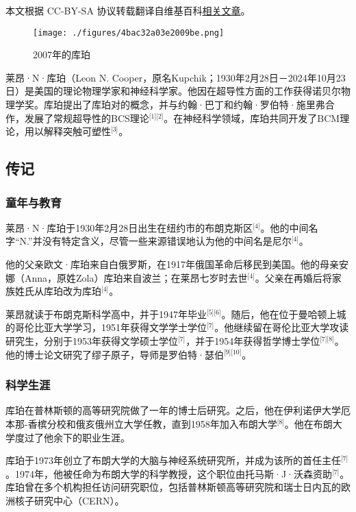
本文根据 CC-BY-SA 协议转载翻译自维基百科\href{https://en.wikipedia.org/wiki/Leon_Cooper}{相关文章}。

\begin{figure}[ht]
\centering
\texttt{[image: ./figures/4bac32a03e2009be.png]}
\caption{2007年的库珀} \label{fig_LAkb_3}
\end{figure}
莱昂·N·库珀（Leon N. Cooper，原名Kupchik；1930年2月28日－2024年10月23日）是美国的理论物理学家和神经科学家。他因在超导性方面的工作获得诺贝尔物理学奖。库珀提出了库珀对的概念，并与约翰·巴丁和约翰·罗伯特·施里弗合作，发展了常规超导性的BCS理论\(^\text{[1][2]}\)。在神经科学领域，库珀共同开发了BCM理论，用以解释突触可塑性\(^\text{[3]}\)。
\subsection{传记}
\subsubsection{童年与教育}
莱昂·N·库珀于1930年2月28日出生在纽约市的布朗克斯区\(^\text{[4]}\)。他的中间名字“N.”并没有特定含义，尽管一些来源错误地认为他的中间名是尼尔\(^\text{[4]}\)。

他的父亲欧文·库珀来自白俄罗斯，在1917年俄国革命后移民到美国。他的母亲安娜（Anna，原姓Zola）库珀来自波兰；在莱昂七岁时去世\(^\text{[4]}\)。父亲在再婚后将家族姓氏从库珀改为库珀\(^\text{[4]}\)。

莱昂就读于布朗克斯科学高中，并于1947年毕业\(^\text{[5][6]}\)。随后，他在位于曼哈顿上城的哥伦比亚大学学习，1951年获得文学学士学位\(^\text{[7]}\)。他继续留在哥伦比亚大学攻读研究生，分别于1953年获得文学硕士学位\(^\text{[7]}\)，并于1954年获得哲学博士学位\(^\text{[7][8]}\)。他的博士论文研究了缪子原子，导师是罗伯特·瑟伯\(^\text{[9][10]}\)。
\subsubsection{科学生涯}
库珀在普林斯顿的高等研究院做了一年的博士后研究。之后，他在伊利诺伊大学厄本那-香槟分校和俄亥俄州立大学任教，直到1958年加入布朗大学\(^\text{[8]}\)。他在布朗大学度过了他余下的职业生涯。

库珀于1973年创立了布朗大学的大脑与神经系统研究所，并成为该所的首任主任\(^\text{[7]}\)。1974年，他被任命为布朗大学的科学教授，这个职位由托马斯·J·沃森资助\(^\text{[7]}\)。库珀曾在多个机构担任访问研究职位，包括普林斯顿高等研究院和瑞士日内瓦的欧洲核子研究中心（CERN）。

